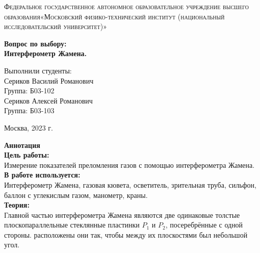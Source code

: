 \documentclass[a4paper, 12pt]{article}%
\begin{document}
	\begin{titlepage}
		\begin{center}
			\textsc{Федеральное государственное автономное образовательное учреждение высшего образования«Московский физико-технический институт (национальный исследовательский университет)»\\[5mm]
			}
			
			\vfill
			
			\textbf{Вопрос по выбору: \\[3mm]
				Интерферометр Жамена.
				\\[50mm]
			}
			
		\end{center}
		
		\hfill
		\begin{minipage}{.5\textwidth}
			Выполнили студенты:\\[2mm]
			Сериков Василий Романович\\[2mm]
			Группа: Б03-102\\[5mm]
			Сериков Алексей Романович\\[2mm]
			Группа: Б03-103\\[5mm]
			
		\end{minipage}
		\vfill
		\begin{center}
			Москва, 2023 г.
		\end{center}
		
	\end{titlepage}
	
	\newpage
	\textbf{Аннотация}\\
	
	
	\textbf{Цель работы: }\\
	
	Измерение показателей преломления газов с помощью интерферометра Жамена.\\
	
	\textbf{В работе используется: }\\
	
	Интерферометр Жамена, газовая кювета,
	осветитель, зрительная труба, сильфон, баллон с углекислым газом,
	манометр, краны.\\
	
	\textbf{Теория: }\\
	
	Главной частью интерферометра Жамена являются две одинаковые толстые плоскопараллельные стеклянные
	пластинки $P_1$ и $P_2$, посеребрённые с одной стороны. расположены они так, чтобы между их плоскостями был небольшой угол.
	
\end{document}
